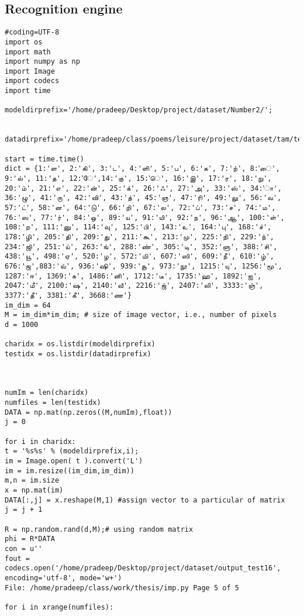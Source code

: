 \subsection{Recognition engine}
\begin{verbatim}
#coding=UTF-8
import os
import math
import numpy as np
import Image
import codecs
import time

modeldirprefix='/home/pradeep/Desktop/project/dataset/Number2/';


datadirprefix='/home/pradeep/class/poems/leisure/project/dataset/tam/test16_prop_bin/';

start = time.time()
dict = {1:'ள', 2:'கி', 3:'ட', 4:'ளி', 5:'ப', 6:'க', 7:'ற்', 8:'ை', 9:'ல்', 11:'த', 12:'ே',14:'கு', 15:'ெ', 16:'இ', 17:'ர', 18:'று', 20:'ம்', 21:'எ', 22:'ன்', 25:'க்', 26:'ஃ', 27:'அ', 33:'ஸ்', 34:'ா', 36:'ழு', 41:'ரு', 42:'வி', 43:'த்', 45:'ஞ', 47:'ரி', 49:'லு', 56:'வ', 57:'ட்', 58:'ன', 64:'டு', 66:'றி', 67:'ல', 72:'ப்', 73:'ச', 74:'ம', 76:'ஸ', 77:'ர்', 84:'ஒ', 89:'ய', 91:'யி', 92:'ந', 96:'ஆ', 100:'ள்', 108:'ற', 111:'னு', 114:'வு', 125:'பி', 143:'உ', 164:'பு', 168:'ச்', 178:'ழி', 205:'தி', 209:'து', 211:'கூ', 213:'மு', 225:'நி', 229:'ந்', 234:'ஜி', 251:'ய்', 263:'ங்', 288:'ண்', 305:'டி', 352:'ளு', 388:'சி', 438:'யூ', 498:'ஏ', 520:'ழ', 572:'மி', 607:'ஸி', 609:'நீ', 610:'ழ்', 676:'ஜ',883:'வ்', 936:'ஷி', 939:'சூ', 973:'நூ', 1215:'யு', 1256:'மூ', 1287:'ஈ', 1369:'சு', 1486:'னி', 1712:'டீ', 1735:'ஹ', 1892:'ஐ', 2047:'மீ', 2100:'ஷ', 2140:'வீ', 2216:'ஜ்', 2407:'லி', 3333:'ஞ்', 3377:'தீ', 3381:'கீ', 3668:'ண'}
im_dim = 64
M = im_dim*im_dim; # size of image vector, i.e., number of pixels
d = 1000

charidx = os.listdir(modeldirprefix)
testidx = os.listdir(datadirprefix)



numIm = len(charidx)
numfiles = len(testidx)
DATA = np.mat(np.zeros((M,numIm),float))
j = 0

for i in charidx:
t = '%s%s' % (modeldirprefix,i);
im = Image.open( t ).convert('L')
im = im.resize((im_dim,im_dim))
m,n = im.size
x = np.mat(im)
DATA[:,j] = x.reshape(M,1) #assign vector to a particular of matrix
j = j + 1

R = np.random.rand(d,M);# using random matrix
phi = R*DATA
con = u''
fout = codecs.open('/home/pradeep/Desktop/project/dataset/output_test16', encoding='utf-8', mode='w+')
File: /home/pradeep/class/work/thesis/imp.py Page 5 of 5

for i in xrange(numfiles):




\end{verbatim}
